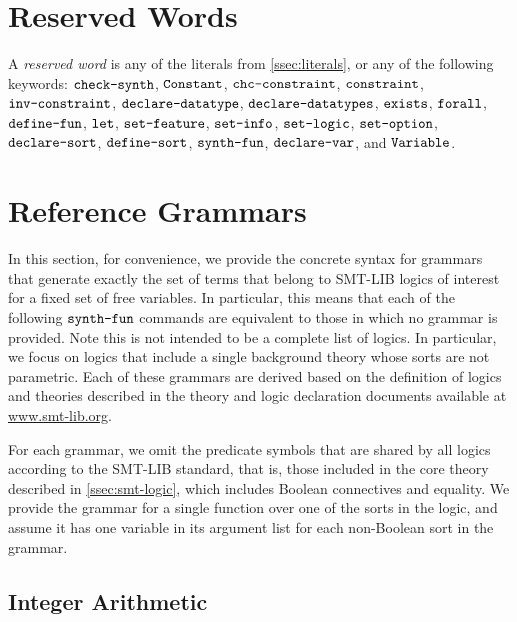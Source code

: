 \documentclass[english,a4paper,10pt]{article}
\begin{document}
\newpage
\begin{appendix}

\section{Reserved Words}%
\label{apx:reserved}

A \emph{reserved word} is any of the 
literals from \cref{ssec:literals},
or any of the following keywords:
$\texttt{check-synth}$,
$\texttt{Constant}$,
$\texttt{chc-constraint}$,
$\texttt{constraint}$,
$\texttt{inv-constraint}$,
$\texttt{declare-datatype}$,
$\texttt{declare-datatypes}$,
$\texttt{exists}$,
$\texttt{forall}$,
$\texttt{define-fun}$,
$\texttt{let}$,
$\texttt{set-feature}$,
$\texttt{set-info}$,
$\texttt{set-logic}$,
$\texttt{set-option}$,
$\texttt{declare-sort}$,
$\texttt{define-sort}$,
$\texttt{synth-fun}$,
$\texttt{declare-var}$, and
$\texttt{Variable}$.


\section{Reference Grammars}%
\label{apx:ref-grammars}

In this section, for convenience, we provide the concrete syntax for
grammars that generate exactly the set of terms 
that belong to SMT-LIB logics of interest for a fixed set of free variables.
In particular, this means that each of the following $\texttt{synth-fun}$
commands are equivalent to those in which no grammar is provided.
Note this is not intended to be a complete list of logics.
In particular, we focus on logics that include a single background theory
whose sorts are not parametric.
Each of these grammars are derived
based on the definition of logics and theories
described in the theory and logic declaration documents
available at \url{www.smt-lib.org}.

For each grammar, we omit 
the predicate symbols that are shared by all logics
according to the SMT-LIB standard, that is,
those included in the core theory described in \cref{ssec:smt-logic},
which includes Boolean connectives and equality.
We provide the grammar
for a single function over one of the sorts in the logic,
and assume it has one variable in its argument list
for each non-Boolean sort in the grammar.

\subsection{Integer Arithmetic}


\end{appendix}
\end{document}
